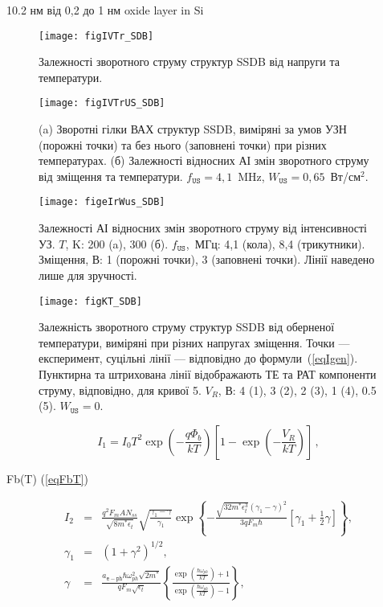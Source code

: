 \documentclass[a4paper,14pt,oneside,openany]{memoir}
\begin{document}
10.2 нм \cite{SHIWAKOTI2018}
від 0,2 до 1 нм oxide layer in Si\cite{Saito}


\cite{MirzadeR,ZobovFTP2008,Teterkin2009r,Pashaev2014r,YOlikhTPL2011r,Vlasov2009r,Vlasenko2000r,VI:Luc,PF:ZhdanovaR}



\begin{figure}
\center
\texttt{[image: figIVTr\_SDB]}
\caption{\label{figIVTr_SDB}
Залежності зворотного струму структур SSDB від напруги та температури.
}%
\end{figure}

\begin{figure}
\center
\texttt{[image: figIVTrUS\_SDB]}
\caption{\label{figIVTrUS_SDB}
(a) Зворотні гілки ВАХ структур SSDB, виміряні за умов УЗН (порожні точки) та без нього (заповнені точки) при різних температурах.
(б) Залежності відносних АІ змін зворотного струму від зміщення та температури.
$f_\mathtt{US}=4,1$~MHz, $W_\mathtt{US}=0,65$~Вт/см$^2$.
}%
\end{figure}

\begin{figure}
\center
\texttt{[image: figeIrWus\_SDB]}
\caption{\label{figeIrWus_SDB}
Залежності АІ відносних змін зворотного струму від інтенсивності УЗ.
$T$, K: 200 (a), 300 (б).
$f_\mathtt{US}$,~МГц: 4,1 (кола), 8,4 (трикутники).
Зміщення, В: 1 (порожні точки), 3 (заповнені точки).
Лінії наведено лише для зручності.
}%
\end{figure}

\begin{figure}
\center
\texttt{[image: figKT\_SDB]}
\caption{\label{figKT_SDB}
Залежність зворотного струму структур SSDB від оберненої температури,
виміряні при різних напругах зміщення.
Точки --- експеримент,
суцільні лінії --- відповідно до формули~(\ref{eqIgen}).
Пунктирна та штрихована лінії відображають ТЕ та РАТ компоненти струму, відповідно, для кривої 5.
$V_R$, В: 4 (1), 3 (2), 2 (3), 1 (4), 0.5 (5).
$W_\mathtt{US}=0$.
}%
\end{figure}


\begin{equation}\label{eqIte_SDB}
    I_1=I_0T^2\exp\left(-\frac{q\Phi_b}{kT}\right)\left[1-\exp\left(-\frac{V_R}{kT}\right)\right]\,,
\end{equation}

Fb(T) (\ref{eqFbT})

\begin{eqnarray}
\label{eqIpat}
 I_{2}&=&\frac{q^2F_mAN_{ss}}{\sqrt{8m^*\epsilon_t}}\sqrt{\frac{\gamma_1-\gamma}{\gamma_1}}\exp
    \left\{-\frac{\sqrt{32m^*\epsilon_t^3}\left(\gamma_1-\gamma\right)^2}{3qF_m\hbar}
    [\gamma_1+\frac{1}{2}\gamma]\right\}, \\
    \gamma_1&=&(1+\gamma^2)^{1/2},\\
    \gamma&=&\frac{a_\mathtt{e-ph}\hbar\omega_{ph}^2\sqrt{2m^*}}{qF_m\sqrt{\epsilon_t}}
    \left\{\frac{\exp\left(\frac{\hbar\omega_{ph}}{kT}\right)+1}{\exp\left(\frac{\hbar\omega_{ph}}{kT}\right)-1}\right\},
\end{eqnarray}
\end{document}
